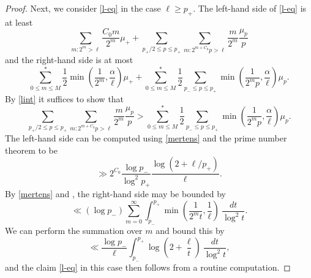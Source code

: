 \documentclass[10pt,a4paper,reqno]{amsart}
\numberwithin{equation}{section}
\theoremstyle{plain}
\theoremstyle{definition}
\begin{document}
\begin{proof}
Next, we consider \eqref{l-eq} in the case $\ell \geq p_+$.  The left-hand side of \eqref{l-eq} is at least
$$ \sum_{m: 2^m > \ell} \frac{C_0 m}{2^m} \mu_+
+ \sum_{p_+/2 \leq p \leq p_+} \sum_{m: 2^{m+C_0} p > \ell} \frac{m}{2^m} \frac{\mu_p}{p}$$
and the right-hand side is at most
\begin{equation}\label{amp}
  \sum_{0 \leq m \leq M}^* \frac{1}{2} \min(\frac{1}{2^m}, \frac{\alpha}{\ell})\mu_+ + \sum_{0 \leq m \leq M}^* \frac{1}{2} \sum_{p_- \leq p \leq p_+} \min\left(\frac{1}{2^mp}, \frac{\alpha}{\ell}\right) \mu_p.
\end{equation}
By \eqref{lint} it suffices to show that
$$
\sum_{p_+/2 \leq p \leq p_+} \sum_{m: 2^{m+C_0} p > \ell} \frac{m}{2^m} \frac{\mu_p}{p}
> \sum_{0 \leq m \leq M}^* \frac{1}{2} \sum_{p_- \leq p \leq p_+} \min\left(\frac{1}{2^mp}, \frac{\alpha}{\ell}\right) \mu_p.$$
The left-hand side can be computed using \eqref{mertens} and the prime number theorem to be
$$ \gg 2^{C_0} \frac{\log p_-}{\log^2 p_+} \frac{\log (2+\ell/p_+)}{\ell}.$$
By \eqref{mertens} and , the right-hand side may be bounded by
$$ \ll (\log p_-) \sum_{m=0}^\infty \int_{p_-}^{p_+} \min\left(\frac{1}{2^m t}, \frac{1}{\ell}\right)\ \frac{dt}{\log^2 t}.$$
We can perform the summation over $m$ and bound this by
$$ \ll \frac{\log p_-}{\ell} \int_{p_-}^{p_+} \log\left(2 + \frac{\ell}{t}\right)\ \frac{dt}{\log^2 t},$$
and the claim \eqref{l-eq} in this case then follows from a routine computation.


\end{proof}
\end{document}
